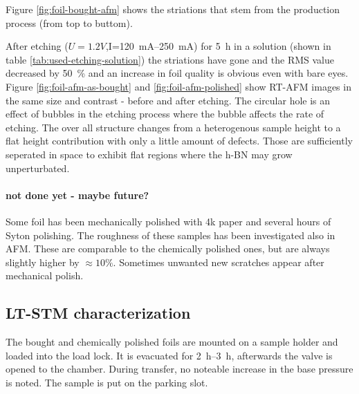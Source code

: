 	Figure \ref{fig:foil-bought-afm} shows the striations that stem from the production process (from top to buttom).
	
	After etching ($U=1.2V$,I=\SIrange{120}{250}{\mA}) for \SI{5}{\hour} in a solution (shown in table \ref{tab:used-etching-solution}) the striations have gone and the RMS value decreased by \SI{50}{\percent} and an increase in foil quality is obvious even with bare eyes. Figure \ref{fig:foil-afm-as-bought} and \ref{fig:foil-afm-polished} show RT-AFM images in the same size and contrast - before and after etching.
	The circular hole is an effect of bubbles in the etching process where the bubble affects the rate of etching. The over all structure changes from a heterogenous sample height to a flat height contribution with only a little amount of defects. Those are sufficiently seperated in space to exhibit flat regions where the h-BN may grow unperturbated.
	
	\paragraph{not done yet - maybe future?}
	Some foil has been mechanically polished with 4k paper and several hours of Syton polishing. The roughness of these samples has been investigated also in AFM. These are comparable to the chemically polished ones, but are always slightly higher by $\approx 10\%$. Sometimes unwanted new scratches appear after mechanical polish.
	
	\subsection{LT-STM characterization}
		\label{section:foil-STM}
		The bought and chemically polished foils are mounted on a sample holder and loaded into the load lock. It is evacuated for \SIrange{2}{3}{\hour}, afterwards the valve is opened to the chamber. During transfer, no noteable increase in the base pressure is noted. The sample is put on the parking slot.
		
